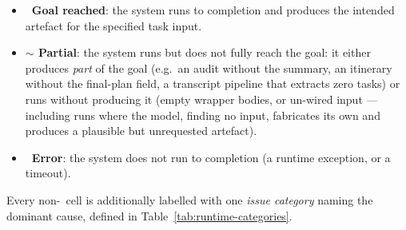 \begin{itemize}
  \item \textbf{\ Goal reached}: the system runs to completion and
        produces the intended artefact for the specified task input.
  \item \textbf{$\sim$ Partial}: the system runs but does not fully reach the
        goal: it either produces \emph{part} of the goal (e.g.\ an audit without
        the summary, an itinerary without the final-plan field, a transcript
        pipeline that extracts zero tasks) or runs without producing it (empty
        wrapper bodies, or un-wired input --- including runs where the model,
        finding no input, fabricates its own and produces a plausible but
        unrequested artefact).
  \item \textbf{\ Error}: the system does not run to completion (a
        runtime exception, or a timeout).
\end{itemize}

Every non-\ cell is additionally labelled with one \emph{issue category}
naming the dominant cause, defined in Table~\ref{tab:runtime-categories}.

